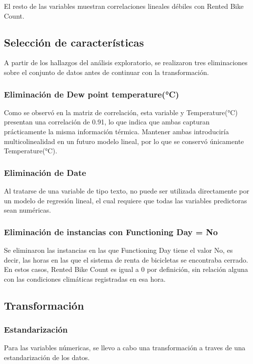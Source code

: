 \documentclass[10pt,journal,compsoc]{IEEEtran}
\begin{document}
El resto de las variables muestran correlaciones lineales débiles con Rented Bike Count.

\subsection[aa]{Selección de características}
A partir de los hallazgos del análisis exploratorio, se realizaron tres eliminaciones sobre el conjunto de datos antes de continuar con la transformación.

\subsubsection{Eliminación de Dew point temperature(°C)}
Como se observó en la matriz de correlación, esta variable y Temperature(°C) presentan una correlación de 0.91, lo que indica que ambas capturan prácticamente la misma información térmica. Mantener ambas introduciría multicolinealidad en un futuro modelo lineal, por lo que se conservó únicamente Temperature(°C).

\subsubsection{Eliminación de Date}
Al tratarse de una variable de tipo texto, no puede ser utilizada directamente por un modelo de regresión lineal, el cual requiere que todas las variables predictoras sean numéricas.

\subsubsection{Eliminación de instancias con Functioning Day = No}
Se eliminaron las instancias en las que Functioning Day tiene el valor No, es decir, las horas en las que el sistema de renta de bicicletas se encontraba cerrado. En estos casos, Rented Bike Count es igual a 0 por definición, sin relación alguna con las condiciones climáticas registradas en esa hora. 

\subsection{Transformación}
\subsubsection{Estandarización}
Para las variables númericas, se llevo a cabo una transformación a traves de una estandarización de los datos. 
\end{document}
